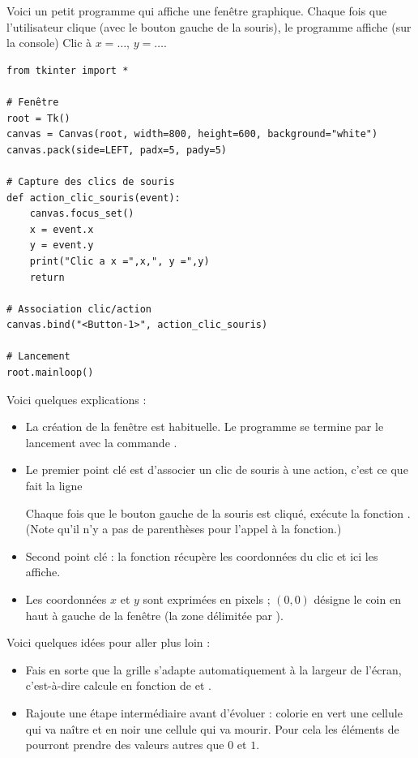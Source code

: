 \documentclass[11pt,class=report,crop=false]{standalone}
\begin{document}
\begin{cours}


Voici un petit programme qui affiche une fenêtre graphique. Chaque fois que l'utilisateur clique (avec le bouton gauche de la souris), le programme affiche (sur la console) \og{}Clic à $x=\ldots$, $y=\ldots$\fg{}. 

\begin{lstlisting}
from tkinter import *

# Fenêtre
root = Tk()
canvas = Canvas(root, width=800, height=600, background="white")
canvas.pack(side=LEFT, padx=5, pady=5)

# Capture des clics de souris
def action_clic_souris(event):
    canvas.focus_set()
    x = event.x
    y = event.y
    print("Clic a x =",x,", y =",y)
    return

# Association clic/action
canvas.bind("<Button-1>", action_clic_souris)

# Lancement
root.mainloop()
\end{lstlisting}


Voici quelques explications :
\begin{itemize}
  \item La création de la fenêtre est habituelle. Le programme se termine par le lancement avec la commande .
  
  \item Le premier point clé est d'associer un clic de souris à une action, c'est ce que fait la ligne \\
\centerline{}
Chaque fois que le bouton gauche de la souris est cliqué, \Python{} exécute la fonction . (Note qu'il n'y a pas de parenthèses pour l'appel à la fonction.)

   \item Second point clé : la fonction  récupère les coordonnées du clic et ici les affiche.
   
   \item Les coordonnées $x$ et $y$ sont exprimées en pixels ; $(0,0)$ désigne le coin en haut à gauche de la fenêtre (la zone délimitée par ).
\end{itemize}
\end{cours}



Voici quelques idées pour aller plus loin :
\begin{itemize}
  \item Fais en sorte que la grille s'adapte automatiquement à la largeur de l'écran, c'est-à-dire calcule  en fonction de  et .
  
  \item Rajoute une étape intermédiaire avant d'évoluer : colorie en vert une cellule qui va naître et en noir une cellule qui va mourir. Pour cela les éléments de  pourront prendre des valeurs autres que $0$ et $1$.
\end{itemize}
\end{document}
